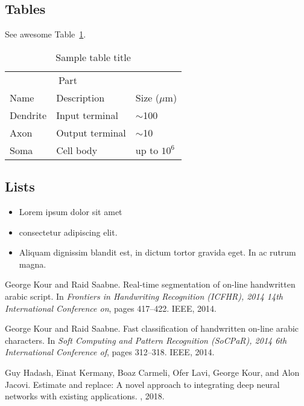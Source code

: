 \documentclass{article}
\begin{document}
\subsection{Tables}
\lipsum[12]
See awesome Table~\ref{tab:table}.

\begin{table}
 \caption{Sample table title}
  \centering
  \begin{tabular}{lll}
    \toprule
    \multicolumn{2}{c}{Part}                   \\
    \cmidrule(r){1-2}
    Name     & Description     & Size ($\mu$m) \\
    \midrule
    Dendrite & Input terminal  & $\sim$100     \\
    Axon     & Output terminal & $\sim$10      \\
    Soma     & Cell body       & up to $10^6$  \\
    \bottomrule
  \end{tabular}
  \label{tab:table}
\end{table}

\subsection{Lists}
\begin{itemize}
\item Lorem ipsum dolor sit amet
\item consectetur adipiscing elit. 
\item Aliquam dignissim blandit est, in dictum tortor gravida eget. In ac rutrum magna.
\end{itemize}


  


\begin{thebibliography}{1}

George Kour and Raid Saabne.
\newblock Real-time segmentation of on-line handwritten arabic script.
\newblock In {\em Frontiers in Handwriting Recognition (ICFHR), 2014 14th
  International Conference on}, pages 417--422. IEEE, 2014.

George Kour and Raid Saabne.
\newblock Fast classification of handwritten on-line arabic characters.
\newblock In {\em Soft Computing and Pattern Recognition (SoCPaR), 2014 6th
  International Conference of}, pages 312--318. IEEE, 2014.

Guy Hadash, Einat Kermany, Boaz Carmeli, Ofer Lavi, George Kour, and Alon
  Jacovi.
\newblock Estimate and replace: A novel approach to integrating deep neural
  networks with existing applications.
, 2018.

\end{thebibliography}
\end{document}

